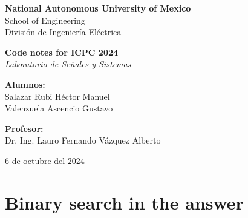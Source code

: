 \documentclass{article}
\begin{document}
\begin{titlepage}
    \begin{center}
        
        \Large\textbf{National Autonomous University of Mexico} \\
        \Large{School of Engineering} \\
        \Large{División de Ingeniería Eléctrica}
        
        \vspace*{5cm}
        
        \Huge\textbf{Code notes for ICPC 2024}\\[0.5cm]
        
        \Large\textit{Laboratorio de Señales y Sistemas}
        
        \vspace{4cm}
        
        \Large
        \textbf{Alumnos:} \\
        Salazar Rubi Héctor Manuel\\
        Valenzuela Ascencio Gustavo
        
        \vspace{2cm}
        
        \Large
        \textbf{Profesor:} \\
        Dr. Ing. Lauro Fernando Vázquez Alberto
        
        \vfill
        
        \Large{6 de octubre del 2024}

    \end{center}
\end{titlepage}
\section{Binary search in the answer}
\end{document}
